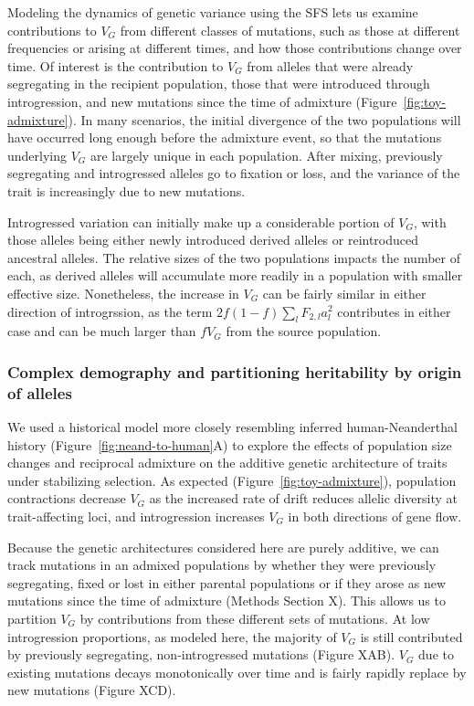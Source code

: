 \documentclass{article}
\begin{document}
Modeling the dynamics of genetic variance using the SFS lets us examine
contributions to $V_G$ from different classes of mutations, such as those at
different frequencies or arising at different times, and how those
contributions change over time. Of interest is the contribution to $V_G$ from
alleles that were already segregating in the recipient population, those that
were introduced through introgression, and new mutations since the time of
admixture (Figure~\ref{fig:toy-admixture}). In many scenarios, the initial
divergence of the two populations will have occurred long enough before the
admixture event, so that the mutations underlying $V_G$ are largely unique in
each population. After mixing, previously segregating and introgressed alleles
go to fixation or loss, and the variance of the trait is increasingly due to
new mutations. 

Introgressed variation can initially make up a considerable portion of $V_G$,
with those alleles being either newly introduced derived alleles or
reintroduced ancestral alleles. The relative sizes of the two populations
impacts the number of each, as derived alleles will accumulate more readily in
a population with smaller effective size. Nonetheless, the increase in $V_G$
can be fairly similar in either direction of introgrssion, as the term
\(2f(1-f)\sum_l F_{2,l} a_l^2\) contributes in either case and can be much
larger than $f V_G$ from the source population.

\subsubsection*{Complex demography and partitioning heritability by origin of alleles}

We used a historical model more closely resembling inferred human-Neanderthal
history (Figure~\ref{fig:neand-to-human}A) to explore the effects of population
size changes and reciprocal admixture on the additive genetic architecture of
traits under stabilizing selection. As expected
(Figure~\ref{fig:toy-admixture}), population contractions decrease $V_G$ as the
increased rate of drift reduces allelic diversity at trait-affecting loci, and
introgression increases $V_G$ in both directions of gene flow.

Because the genetic architectures considered here are purely additive, we can
track mutations in an admixed populations by whether they were previously
segregating, fixed or lost in either parental populations or if they arose as
new mutations since the time of admixture (Methods Section X). This allows us
to partition $V_G$ by contributions from these different sets of mutations. At
low introgression proportions, as modeled here, the majority of $V_G$ is still
contributed by previously segregating, non-introgressed mutations (Figure XAB).
$V_G$ due to existing mutations decays monotonically over time and is fairly
rapidly replace by new mutations (Figure XCD).
\end{document}
